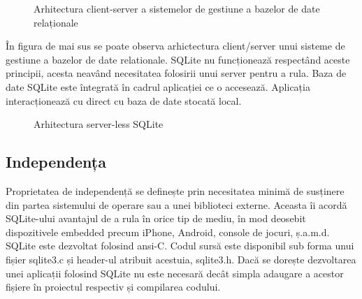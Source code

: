 \begin{figure}[h!]
  \centering
  \caption{Arhitectura client-server a sistemelor de gestiune a bazelor de date relaționale}
\end{figure}

În figura de mai sus se poate observa arhictectura client/server unui sisteme de gestiune a bazelor de date relationale.
SQLite nu funcționează respectând aceste principii, acesta neavând necesitatea folosirii unui server pentru a rula.
Baza de date SQLite este întegrată în cadrul aplicației ce o accesează. Aplicația interacționează cu direct cu baza de date stocată local.

\begin{figure}[h!]
  \centering
  \caption{Arhitectura server-less SQLite}
\end{figure}

\subsection{Independența}
Proprietatea de independență se definește prin necesitatea minimă de susținere din partea sistemului de operare sau a unei biblioteci externe. Aceasta îi acordă SQLite-ului avantajul de a rula în orice tip de mediu, în mod deosebit dispozitivele embedded precum iPhone, Android, console de jocuri, ș.a.m.d.
\vspace{6pt}
\\SQLite este dezvoltat folosind \acrshort{ansi}-C. Codul sursă este disponibil sub forma unui fișier sqlite3.c și header-ul atribuit acestuia, sqlite3.h. Dacă se dorește dezvoltarea unei aplicații folosind SQLite nu este necesară decât simpla adaugare a acestor fișiere în proiectul respectiv și compilarea codului.

